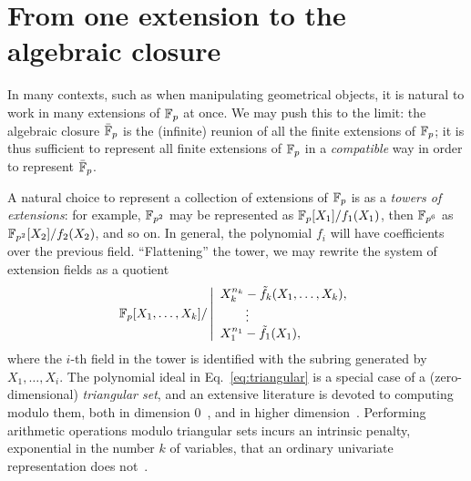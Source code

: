 \documentclass[b5layout]{hdr}
\begin{document}

\section{From one extension to the algebraic closure}

In many contexts, such as when manipulating geometrical objects, it is
natural to work in many extensions of $\mathbb{F}_p$ at once. %
We may push this to the limit: the algebraic closure $\bar{\mathbb{F}}_p$ is
the (infinite) reunion of all the finite extensions of $\mathbb{F}_p$; it is
thus sufficient to represent all finite extensions of $\mathbb{F}_p$ in a
\emph{compatible} way in order to represent $\bar{\mathbb{F}}_p$.

A natural choice to represent a collection of extensions of $\mathbb{F}_p$ is
as a \emph{towers of extensions}: for example, $\mathbb{F}_{p^2}$ may be
represented as $\mathbb{F}_{p}[X_1]/f_1(X_1)$, then $\mathbb{F}_{p^6}$ as
$\mathbb{F}_{p^2}[X_2]/f_2(X_2)$, and so on. %
In general, the polynomial $f_i$ will have coefficients over the
previous field. %
``Flattening'' the tower, we may rewrite the system of extension
fields as a quotient
\begin{equation}
  \label{eq:triangular}
  \mathbb{F}_p[X_1,\dots,X_k] /
  \left|\begin{array}{l}
          X_k^{n_k} - \tilde{f}_k(X_1,\dots,X_k),\\
          \qquad\vdots\\
          X_1^{n_1} - \tilde{f}_1(X_1),
        \end{array}\right.
\end{equation}
where the $i$-th field in the tower is identified with the subring
generated by $X_1,\dots,X_i$. %
The polynomial ideal in Eq.~\eqref{eq:triangular} is a special case of
a (zero-dimensional) \emph{triangular set}, and an extensive
literature is devoted to computing modulo them, both in dimension
0~\cite{LEBRETON2015230,PoSc13b}, and in higher
dimension~\cite{Aubry:1999:TTS:2947511.2947551}. %
Performing arithmetic operations modulo triangular sets incurs an
intrinsic penalty, exponential in the number $k$ of variables, that an
ordinary univariate representation does
not~\cite{canny+kaltofen+yagati89,li+moreno+schost07,vanderHoeven:2004:TFT:1005285.1005327}. %
\end{document}
